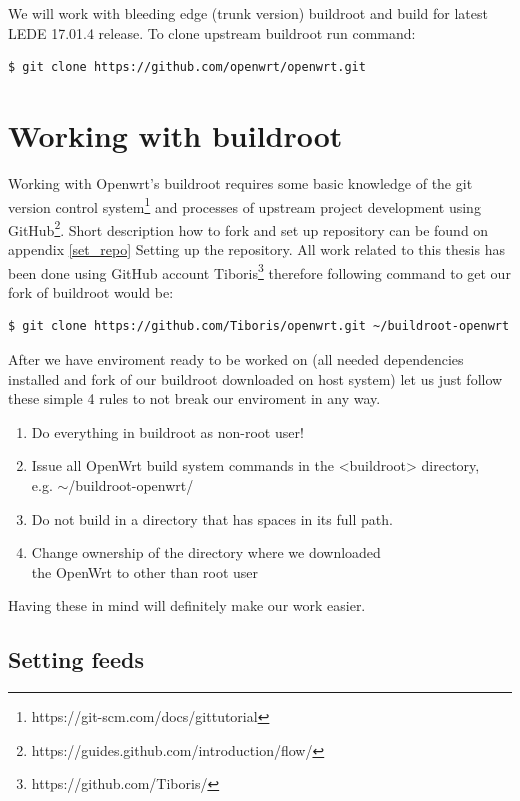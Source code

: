 We will work with bleeding edge (trunk version) buildroot and build for latest LEDE 17.01.4 release.
To clone upstream buildroot run command:
\begin{lstlisting}[columns=fixed,basicstyle=\ttfamily\footnotesize,tabsize=4,backgroundcolor=\color{yellow!10}]
$ git clone https://github.com/openwrt/openwrt.git
\end{lstlisting}

\section{Working with buildroot}\label{working-with-buildroot}

Working with Openwrt's buildroot requires some basic knowledge of the git version control system\footnote{https://git-scm.com/docs/gittutorial} and processes of upstream project development using GitHub\footnote{https://guides.github.com/introduction/flow/}.
Short description how to fork and set up repository can be found on appendix \ref{set_repo} Setting up the repository.
All work related to this thesis has been done using GitHub account Tiboris\footnote{https://github.com/Tiboris/} therefore following command to get our fork of buildroot would be:
\begin{lstlisting}[columns=fixed,basicstyle=\ttfamily\footnotesize,tabsize=4,backgroundcolor=\color{yellow!10}]
$ git clone https://github.com/Tiboris/openwrt.git ~/buildroot-openwrt
\end{lstlisting}

After we have enviroment ready to be worked on (all needed dependencies installed and fork of our buildroot downloaded on host system) let us just follow these simple 4 rules to not break our enviroment in any way.
\begin{enumerate}
    \item Do everything in buildroot as non-root user!
    \item Issue all OpenWrt build system commands in the <buildroot> directory, \\e.g. $\sim$/buildroot-openwrt/
    \item Do not build in a directory that has spaces in its full path.
    \item Change ownership of the directory where we downloaded \\the OpenWrt to other than root user
\end{enumerate}
Having these in mind will definitely make our work easier.

\subsection{Setting feeds}

